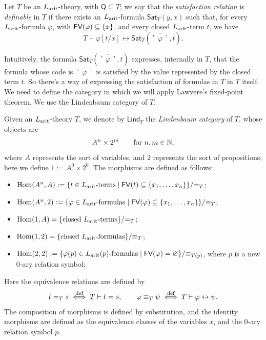 \begin{definition}
    Let $T$ be an $L_{\textnormal{arit}}$-theory, with $\mathsf{Q} \subseteq T$; we say that the \emph{satisfaction relation} is \emph{definable} in $T$ if there exists an $L_{\textnormal{arit}}$-formula $\mathsf{Sat}_T(y,x)$
    such that, for every $L_{\textnormal{arit}}$-formula $\varphi$, with $\textsf{FV}(\varphi) \subseteq \{x\}$, and every closed $L_{\textnormal{arit}}$-term $t$, we have
    \[ T \vdash \varphi[t/x] \leftrightarrow \mathsf{Sat}_T(\overline{\ulcorner\varphi\urcorner},t). \]
\end{definition}

Intuitively, the formula $\mathsf{Sat}_T(\overline{\ulcorner\varphi\urcorner},t)$ expresses, internally in $T$, that the formula whose code is $\ulcorner\varphi\urcorner$ is satisfied by the value represented by the closed term $t$.
So there's a way of expressing the satisfaction of formulas in $T$ in $T$ itself.\newline
We need to define the category in which we will apply Lawvere's fixed-point theorem. We use the Lindenbaum category of $T$.

\begin{definition}\label{idx:lindenbaum}
    Given an $L_{\textnormal{arit}}$-theory $T$, we denote by $\mathsf{Lind}_T$ the \emph{Lindenbaum category} of $T$, whose objects are
    \[ A^n \times 2^m \qquad \text{for $n,m \in \mathbb{N}$}, \]
    where $A$ represents the sort of variables, and $2$ represents the sort of propositions; here we define $1 := A^0 \times 2^0$. The morphisms are defined as follows:
    \begin{itemize}
        \item $\mathrm{Hom}(A^n,A) := \{t \in L_{\textnormal{arit}}\textnormal{-terms} \mid \textsf{FV}(t)\subseteq\{x_1,\ldots,x_n\}\}/{=_T}$;
        \item $\mathrm{Hom}(A^n,2) := \{\varphi \in L_{\textnormal{arit}}\textnormal{-formulas} \mid \textsf{FV}(\varphi)\subseteq\{x_1,\ldots,x_n\}\}/{\equiv_T}$;
        \item $\mathrm{Hom}(1,A) = \{\text{closed }L_{\textnormal{arit}}\text{-terms}\}/{=_T}$;
        \item $\mathrm{Hom}(1,2) = \{\text{closed }L_{\textnormal{arit}}\text{-formulas}\}/{\equiv_T}$;
        \item $\mathrm{Hom}(2,2) := \{\varphi(p) \in L_{\textnormal{arit}}(p)\textnormal{-formulas} \mid \textsf{FV}(\varphi)=\varnothing\}/{\equiv_{T(p)}}$, where $p$ is a new 0-ary relation symbol;
    \end{itemize}
    Here the equivalence relations are defined by
    \[ t =_T s \overset{\textnormal{def}}{\iff} T \vdash t = s, \qquad \varphi \equiv_T \psi \overset{\textnormal{def}}{\iff} T \vdash \varphi \leftrightarrow \psi. \]\label{idx:provable-equality}
    The composition of morphisms is defined by substitution, and the identity morphisms are defined as the equivalence classes of the variables $x_i$ and the 0-ary relation symbol $p$.
\end{definition}

